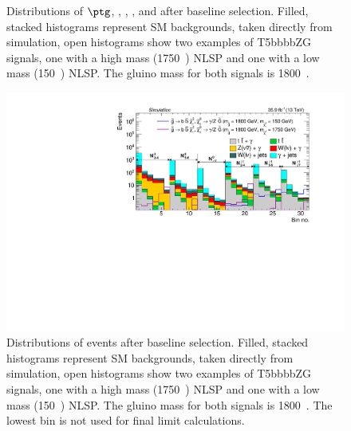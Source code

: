 \begin{figure}[htbp!]
  \captionsetup{width=.9\linewidth}
  \caption[$\ptg$, \ptmiss, \nj, \nb, and \htg after baseline selection]{Distributions of $\ptg$, \ptmiss, \nj, \nb, and \htg after baseline selection.  Filled, stacked histograms represent SM backgrounds, taken directly from simulation, open histograms show two examples of T5bbbbZG signals, one with a high mass (1750~\gev) NLSP and one with a 
  low mass (150~\gev) NLSP.  The gluino mass for both signals is 1800~\gev.}
  \label{fig:baselineKineHist}
\end{figure}

\begin{figure}[h!]
  \centering
  \includegraphics[width=0.98\linewidth]{../Figures/Chap3/event-selection/SMbackgroundVersusSignalRegion.pdf}
  \captionsetup{width=.9\linewidth}
  \caption[MC BG vs signal in search and sideband regions]{Distributions of events after baseline selection.  Filled, stacked histograms represent SM backgrounds, taken directly from 
  simulation, open histograms show two examples of T5bbbbZG signals, one with a high mass (1750~\gev) NLSP and one with a 
  low mass (150~\gev) NLSP.  The gluino mass for both signals is 1800~\gev. The lowest \ptmiss bin is not used for 
  final limit calculations.}
  \label{fig:baselineEvtYield}
\end{figure}

